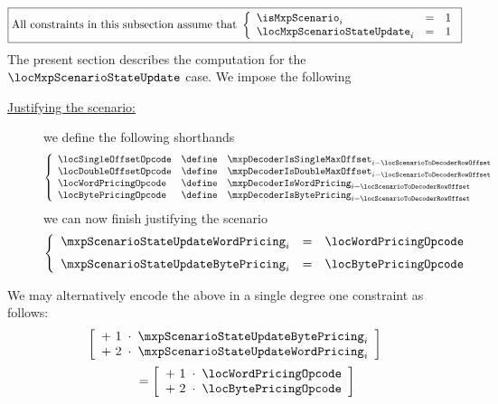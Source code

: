 \[
	\boxed{\text{All constraints in this subsection assume that }
	\left\{ \begin{array}{lcl}
		\isMxpScenario             _{i} & = & 1 \\
		\locMxpScenarioStateUpdate _{i} & = & 1 \\
	\end{array} \right. }
\]
\noindent
The present section describes the computation for the $\locMxpScenarioStateUpdate$ case.
We impose the following
\begin{description}
	\item[\underline{\underline{Justifying the scenario:}}]
		we define the following shorthands
		\[
			\left\{ \begin{array}{lcl}
				\locSingleOffsetOpcode & \define & \mxpDecoderIsSingleMaxOffset _{i - \locScenarioToDecoderRowOffset} \\
				\locDoubleOffsetOpcode & \define & \mxpDecoderIsDoubleMaxOffset _{i - \locScenarioToDecoderRowOffset} \\
				\locWordPricingOpcode  & \define & \mxpDecoderIsWordPricing     _{i - \locScenarioToDecoderRowOffset} \\
				\locBytePricingOpcode  & \define & \mxpDecoderIsBytePricing     _{i - \locScenarioToDecoderRowOffset} \\
			\end{array} \right.
		\]
		we can now finish justifying the scenario
		\[
			\left\{ \begin{array}{lcl}
				\mxpScenarioStateUpdateWordPricing _{i} & = & \locWordPricingOpcode \vspace{2mm} \\
				\mxpScenarioStateUpdateBytePricing _{i} & = & \locBytePricingOpcode              \\
			\end{array} \right.
		\]
\end{description}
\saNote{}
We may alternatively encode the above in a single degree one constraint as follows:
\[
	\begin{array}{l}
		\left[ \begin{array}{lcl}
			+ ~ 1 & \!\!\!\cdot\!\!\! & \mxpScenarioStateUpdateBytePricing _{i} \\
			+ ~ 2 & \!\!\!\cdot\!\!\! & \mxpScenarioStateUpdateWordPricing _{i} \\
		\end{array} \right] \vspace{2mm} \\
		\qquad\qquad =
		\left[ \begin{array}{lcl}
			+ ~ 1 & \!\!\!\cdot\!\!\! & \locWordPricingOpcode  \\
			+ ~ 2 & \!\!\!\cdot\!\!\! & \locBytePricingOpcode  \\
		\end{array} \right] \\
	\end{array}
\]
